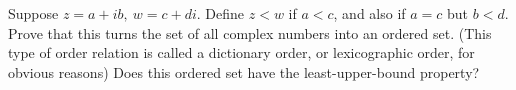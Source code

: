 Suppose $z = a + ib,~w = c+di$. Define $z < w$ if $a<c$, and also if $a=c$ but $b<d$. Prove that this turns the set of all complex numbers into an ordered set. (This type of order relation is called a dictionary order, or lexicographic order, for obvious reasons) Does this ordered set have the least-upper-bound property?

\begin{tcolorbox}
	\begin{solution}
		
	\end{solution}
\end{tcolorbox}
